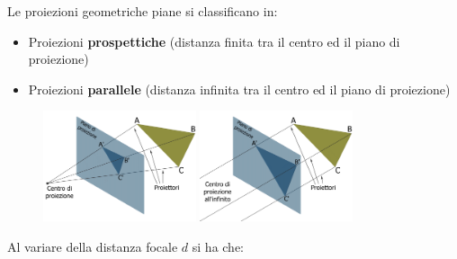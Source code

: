 \documentclass[a4paper, 10pt]{article}
\begin{document}
		\noindent
		Le proiezioni geometriche piane si classificano in:
		\begin{itemize}
			\item Proiezioni \textbf{prospettiche} (distanza finita tra il centro ed il piano di
		proiezione)
			\item Proiezioni \textbf{parallele} (distanza infinita tra il centro ed il piano di
		proiezione)
		\end{itemize}
		\begin{figure}[h!]
			\centering
			\includegraphics[width=0.4\textwidth]{proiez}
			\hspace{0.2cm}
			\includegraphics[width=0.4\textwidth]{proiez1}
		\end{figure}
		Al variare della distanza focale $ d $ si ha che:
\end{document}
